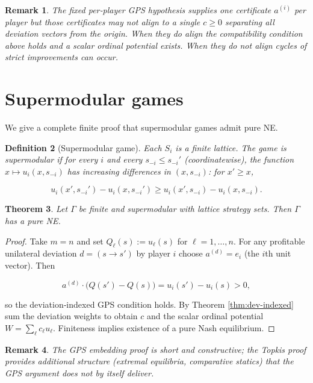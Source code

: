 \documentclass[11pt]{article}
\newtheorem{theorem}{Theorem}[section]
\newtheorem{definition}[theorem]{Definition}
\newtheorem{remark}[theorem]{Remark}
\begin{document}
\begin{remark}
The fixed per‑player GPS hypothesis supplies one certificate $a^{(i)}$ per player but those certificates may not align to a single $c\ge0$ separating all deviation vectors from the origin. When they do align the compatibility condition above holds and a scalar ordinal potential exists. When they do not align cycles of strict improvements can occur.
\end{remark}
\section{Supermodular games}
We give a complete finite proof that supermodular games admit pure NE.

\begin{definition}[Supermodular game]
Each \(S_i\) is a finite lattice. The game is supermodular if for every
\(i\) and every \(s_{-i}\le s_{-i}'\) (coordinatewise), the function
\(x\mapsto u_i(x,s_{-i})\) has increasing differences in \((x,s_{-i})\):
for \(x'\ge x\),


\[
u_i(x',s_{-i}')-u_i(x,s_{-i}') \ge u_i(x',s_{-i})-u_i(x,s_{-i}).
\]


\end{definition}

\begin{theorem}
Let \(\Gamma\) be finite and supermodular with lattice strategy sets. Then
\(\Gamma\) has a pure NE.
\end{theorem}



\begin{proof}
Take $m=n$ and set $Q_\ell(s):=u_\ell(s)$ for $\ell=1,\dots,n$. For any profitable unilateral deviation $d=(s\to s')$ by player $i$ choose $a^{(d)}=e_i$ (the $i$th unit vector). Then


\[
a^{(d)}\cdot\big(Q(s')-Q(s)\big)=u_i(s')-u_i(s)>0,
\]


so the deviation‑indexed GPS condition holds. By Theorem \ref{thm:dev-indexed} sum the deviation weights to obtain $c$ and the scalar ordinal potential $W=\sum_\ell c_\ell u_\ell$. Finiteness implies existence of a pure Nash equilibrium.
\end{proof}

\begin{remark}
The GPS embedding proof is short and constructive; the Topkis proof provides additional structure (extremal equilibria, comparative statics) that the GPS argument does not by itself deliver.
\end{remark}
\end{document}
